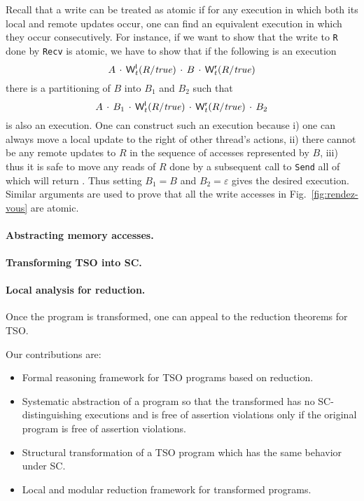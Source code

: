 \documentclass[preprint,9pt]{sigplanconf}
\begin{document}
Recall that a write can be treated as atomic if for any execution in which both its local and remote updates occur, one can find an equivalent execution in which they occur consecutively. 
For instance, if we want to show that the write to {\tt R} done by {\tt Recv} is atomic, we have to show that if the following is an execution
\[
A\,\cdot\,{\mathsf{W}^{\mathsf{l}}_{t}(R/\mathit{true})}\,\cdot\,B\,\cdot\,{\mathsf{W}^{\mathsf{r}}_{t}(R/\mathit{true})}
\]
there is a partitioning of $B$ into $B_1$ and $B_2$ such that
\[
A\,\cdot\,B_1\,\cdot\,{\mathsf{W}^{\mathsf{l}}_{t}(R/\mathit{true})}\,\cdot\,{\mathsf{W}^{\mathsf{r}}_{t}(R/\mathit{true})}\,\cdot\,B_2
\]
is also an execution.
One can construct such an execution because i) one can always move a local update to the right of other thread's actions, ii) there cannot be any remote updates to $R$ in the sequence of accesses represented by $B$, iii) thus it is safe to move any reads of $R$ done by a subsequent call to {\tt Send} all of which will return {\alitrue}.
Thus setting $B_1=B$ and $B_2=\varepsilon$ gives the desired execution.
Similar arguments are used to prove that all the write accesses in Fig.~\ref{fig:rendez-vous} are atomic.

\paragraph{Abstracting memory accesses.}

\paragraph{Transforming TSO into SC.}

\paragraph{Local analysis for reduction.}
Once the program is transformed, one can appeal to the reduction theorems for TSO.


Our contributions are:
\begin{itemize}
\item Formal reasoning framework for TSO programs based on reduction.
\item Systematic abstraction of a program so that the transformed has no SC-distinguishing executions and is free of assertion violations only if the original program is free of assertion violations.
\item Structural transformation of a TSO program which has the same behavior under SC.
\item Local and modular reduction framework for transformed programs.
\end{itemize}
\end{document}
